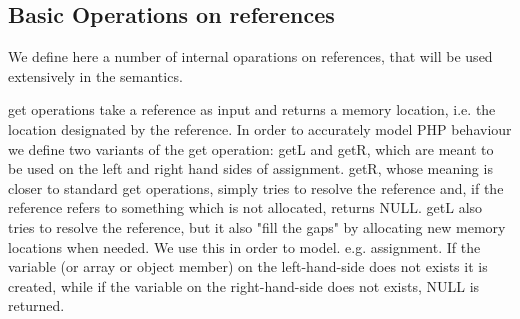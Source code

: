 \documentclass{article}
\begin{document}
\begin{kdefinition}
\begin{module}{}
\begin{kblock}[text]
 \subsection{Basic Operations on references} 
		We define here a number of internal oparations on references, that will be used 
		extensively in the semantics. \end{kblock}
\begin{kblock}[text]
 get operations take a reference as input and returns a memory location, i.e. the location 
    designated by the reference. In order to accurately model PHP behaviour we define two variants
    of the get operation: getL and getR, which are meant to be used on the left and right hand sides 
    of assignment. getR, whose meaning is closer to standard get operations, simply tries to 
    resolve the reference and, if the reference refers to something which is not allocated, returns
    NULL. getL also tries to resolve the reference, but it also "fill the gaps" by allocating 
    new memory locations when needed. We use this in order to model. e.g. assignment. If the variable 
    (or array or object member) on the left-hand-side does not exists it is created, while if 
    the variable on the right-hand-side does not exists, NULL is returned. \end{kblock}


\end{module}
\end{kdefinition}
\end{document}
